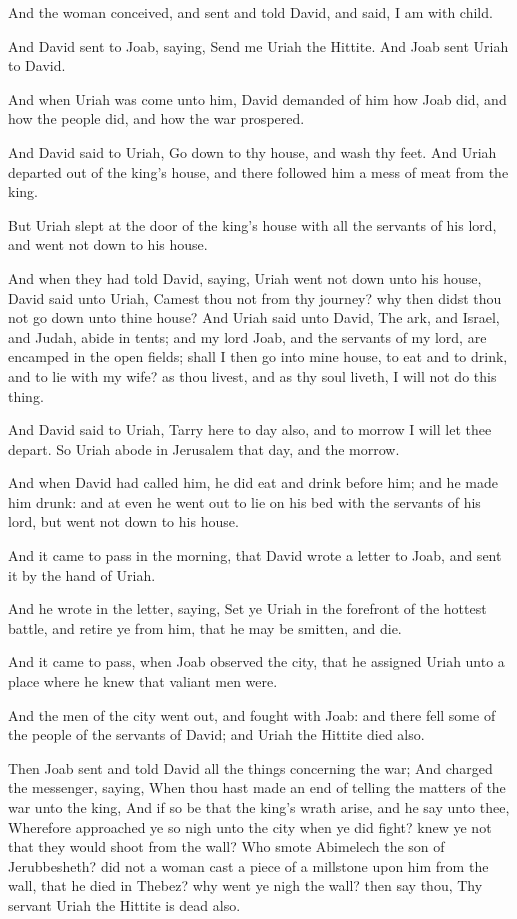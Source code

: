 \Verse And the woman conceived, and sent and told David, and said, I am with child.

\Verse And David sent to Joab, saying, Send me Uriah the Hittite. And Joab sent Uriah to David.

\Verse And when Uriah was come unto him, David demanded of him how Joab did, and how the people did, and how the war prospered.

\Verse And David said to Uriah, Go down to thy house, and wash thy feet.  And Uriah departed out of the king's house, and there followed him a mess of meat from the king.

\Verse But Uriah slept at the door of the king's house with all the servants of his lord, and went not down to his house.

\Verse And when they had told David, saying, Uriah went not down unto his house, David said unto Uriah, Camest thou not from thy journey?  why then didst thou not go down unto thine house?  \Verse And Uriah said unto David, The ark, and Israel, and Judah, abide in tents; and my lord Joab, and the servants of my lord, are encamped in the open fields; shall I then go into mine house, to eat and to drink, and to lie with my wife? as thou livest, and as thy soul liveth, I will not do this thing.

\Verse And David said to Uriah, Tarry here to day also, and to morrow I will let thee depart. So Uriah abode in Jerusalem that day, and the morrow.

\Verse And when David had called him, he did eat and drink before him; and he made him drunk: and at even he went out to lie on his bed with the servants of his lord, but went not down to his house.

\Verse And it came to pass in the morning, that David wrote a letter to Joab, and sent it by the hand of Uriah.

\Verse And he wrote in the letter, saying, Set ye Uriah in the forefront of the hottest battle, and retire ye from him, that he may be smitten, and die.

\Verse And it came to pass, when Joab observed the city, that he assigned Uriah unto a place where he knew that valiant men were.

\Verse And the men of the city went out, and fought with Joab: and there fell some of the people of the servants of David; and Uriah the Hittite died also.

\Verse Then Joab sent and told David all the things concerning the war; \Verse And charged the messenger, saying, When thou hast made an end of telling the matters of the war unto the king, \Verse And if so be that the king's wrath arise, and he say unto thee, Wherefore approached ye so nigh unto the city when ye did fight? knew ye not that they would shoot from the wall?  \Verse Who smote Abimelech the son of Jerubbesheth? did not a woman cast a piece of a millstone upon him from the wall, that he died in Thebez? why went ye nigh the wall? then say thou, Thy servant Uriah the Hittite is dead also.

